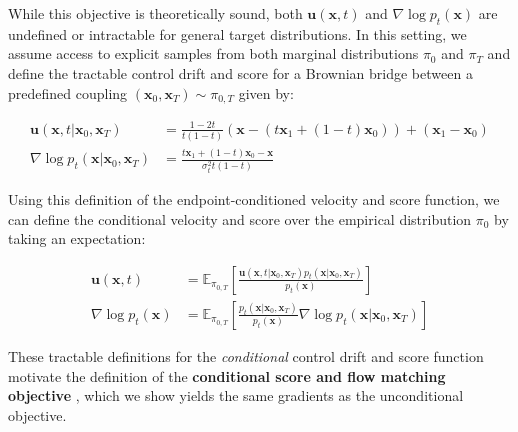 \documentclass{article}
\newcommand{\boldtext}[1]{\textbf{\textcolor{MyGreen}{#1}}}
\begin{document}
While this objective is theoretically sound, both $\boldsymbol{u}(\boldsymbol{x},t)$ and $\nabla \log p_t(\boldsymbol{x})$ are undefined or intractable for general target distributions. In this setting, we assume access to explicit samples from both marginal distributions $\pi_0$ and $\pi_T$ and define the tractable control drift and score for a Brownian bridge between a predefined coupling $(\boldsymbol{x}_0, \boldsymbol{x}_T) \sim \pi_{0,T}$ given by:
\begin{small}
\begin{align}
    \boldsymbol{u}(\boldsymbol{x},t|\boldsymbol{x}_0, \boldsymbol{x}_T)&=\frac{1-2t}{t(1-t)}(\boldsymbol{x}-(t\boldsymbol{x}_1+(1-t)\boldsymbol{x}_0))+(\boldsymbol{x}_1-\boldsymbol{x}_0)\nonumber\\
    \nabla \log p_t(\boldsymbol{x}| \boldsymbol{x}_0, \boldsymbol{x}_T)&=\frac{t\boldsymbol{x}_1+(1-t)\boldsymbol{x}_0-\boldsymbol{x}}{\sigma_t^2t(1-t)}
\end{align}
\end{small}

Using this definition of the endpoint-conditioned velocity and score function, we can define the conditional velocity and score over the empirical distribution $\pi_0$ by taking an expectation:
\begin{small}
\begin{align}
    \boldsymbol{u}(\boldsymbol{x},t)&=\mathbb{E}_{\pi_{0,T}}\left[\frac{\boldsymbol{u}(\boldsymbol{x},t|\boldsymbol{x}_0, \boldsymbol{x}_T)p_t(\boldsymbol{x}|\boldsymbol{x}_0, \boldsymbol{x}_T)}{p_t(\boldsymbol{x})}\right]\\
    \nabla \log p_t(\boldsymbol{x})&=\mathbb{E}_{\pi_{0,T }}\left[\frac{p_t(\boldsymbol{x}|\boldsymbol{x}_0, \boldsymbol{x}_T)}{p_t(\boldsymbol{x})}\nabla \log p_t(\boldsymbol{x}| \boldsymbol{x}_0, \boldsymbol{x}_T)\right]
\end{align}
\end{small}

These tractable definitions for the \textit{conditional} control drift and score function motivate the definition of the \boldtext{conditional score and flow matching objective} \citep{tong2023simulation}, which we show yields the same gradients as the unconditional objective.
\end{document}
